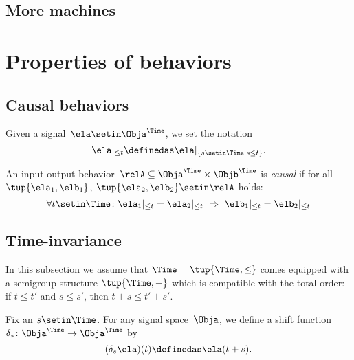 \subsection{More machines}

\section{Properties of behaviors}

\subsection{Causal behaviors}

Given a signal~$\ela \setin \Obja^\Time$, we set the notation
\begin{equation}
    \ela \vert_{\leq t} \definedas  \ela \vert_{\{ s \setin \Time \mid s \leq t\}}.
\end{equation}

\begin{definition}
    An input-output behavior~$\relA \subseteq \Obja^\Time \times \Objb^\Time$ is \emph{causal} if for all~$\tup{\ela_1, \elb_1}$, $\tup{\ela_2, \elb_2} \setin \relA$ holds:
    \begin{equation*}
        \forall t \setin \Time\colon \ela_1 \vert_{ \leq t} = \ela_2 \vert_{ \leq t} \  \Rightarrow \ \elb_1 \vert_{ \leq t} = \elb_2 \vert_{ \leq t}
    \end{equation*}
\end{definition}


\subsection{Time-invariance}

In this subsection we assume that $\Time = \tup{\Time, \leq}$ comes equipped with a semigroup structure $\tup{\Time, +}$ which is compatible with the total order: if $t \leq t'$ and $s \leq s'$, then $t + s \leq t' + s'$.

Fix an $s \setin \Time$.
For any signal space~$\Obja$, we define a shift function~$\delta_s\colon \Obja^\Time \to \Obja^\Time$ by
\begin{equation*}
    (\delta_s \ela)(t) \definedas \ela(t + s).
\end{equation*}

